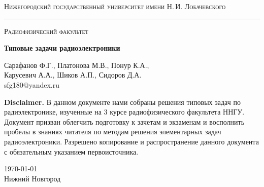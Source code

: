 \begin{titlepage}
\thispagestyle{empty}
\begin{center}
	
{\small\textsc{Нижегородский государственный университет имени Н.\,И. Лобачевского}}
\vskip 3pt \hrule \vskip 5pt
{\small\textsc{Радиофизический факультет}}

\vfill

\begin{spacing}{2}
{\Huge \bf  Типовые задачи радиоэлектроники}\\%
\end{spacing}
\vspace{1em}
{\Large Сарафанов Ф.Г., Платонова М.В., Понур К.А., \\ Карусевич А.А., Шиков А.П., Сидоров Д.А.}\\[2em]
{\large sfg180@yandex.ru}\\
\vspace{1em}
\end{center}

\textbf{Disclaimer.} В данном документе нами собраны решения типовых задач по радиэлектронике, изученные на 3 курсе радиофизического факультета ННГУ. Документ призван облегчить подготовку к зачетам и экзаменам и восполнить пробелы в знаниях читателя по методам решения элементарных задач радиоэлектроники. Разрешено копирование и распространение данного документа с обязательным указанием первоисточника. 
	

\begin{center}
	
\vfill
	
	 \today\\Нижний Новгород
\end{center}

\end{titlepage}

